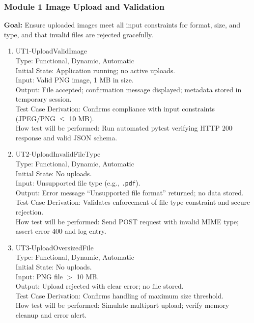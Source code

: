\documentclass[12pt, titlepage]{article}
\begin{document}
\subsubsection{Module 1 \textemdash{} Image Upload and Validation}

\textbf{Goal:} Ensure uploaded images meet all input constraints for
format, size, and type, and that invalid files are rejected gracefully.

\begin{enumerate}
  \item{UT1-UploadValidImage\\}
    Type: Functional, Dynamic, Automatic\\
    Initial State: Application running; no active uploads.\\
    Input: Valid PNG image, 1 MB in size.\\
    Output: File accepted; confirmation message displayed; metadata
    stored in temporary session.\\
    Test Case Derivation: Confirms compliance with input constraints
    (JPEG/PNG $\leq$ 10 MB).\\
    How test will be performed: Run automated pytest verifying HTTP 200
    response and valid JSON schema.

  \item{UT2-UploadInvalidFileType\\}
    Type: Functional, Dynamic, Automatic\\
    Initial State: No uploads.\\
    Input: Unsupported file type (e.g., \texttt{.pdf}).\\
    Output: Error message ``Unsupported file format'' returned; no
    data stored.\\
    Test Case Derivation: Validates enforcement of file type constraint
    and secure rejection.\\
    How test will be performed: Send POST request with invalid MIME
    type; assert error 400 and log entry.

  \item{UT3-UploadOversizedFile\\}
    Type: Functional, Dynamic, Automatic\\
    Initial State: No uploads.\\
    Input: PNG file $>$ 10 MB.\\
    Output: Upload rejected with clear error; no file stored.\\
    Test Case Derivation: Confirms handling of maximum size threshold.\\
    How test will be performed: Simulate multipart upload; verify
    memory cleanup and error alert.
\end{enumerate}
\end{document}
